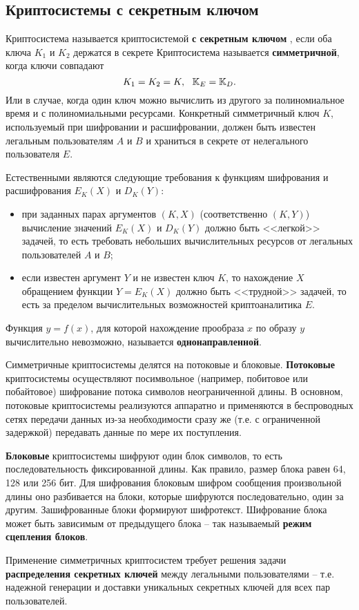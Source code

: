 ﻿\subsection{Криптосистемы с секретным ключом}

Криптосистема  называется криптосистемой \textbf{с секретным ключом} , если оба ключа $K_1$ и $K_2$ держатся в секрете
Криптосистема называется \textbf{симметричной}, когда ключи совпадают
    \[ K_1 = K_2 = K, ~~ \mathbb{K}_E = \mathbb{K}_D. \]
    Или в случае, когда один ключ можно вычислить из другого за полиномиальное время и с полиномиальными ресурсами.
Конкретный симметричный ключ $K$, используемый при шифровании и расшифровании, должен быть известен легальным пользователям $A$ и $B$ и храниться в секрете от нелегального пользователя $E$.

Естественными являются следующие требования к функциям шифрования и расшифрования  $E_K(X)$ и $D_K(Y)$:
\begin{itemize}
  \item при заданных парах аргументов $(K,X)$ (соответственно $(K,Y)$) вычисление значений $E_K(X)$ и $D_K(Y)$ должно быть <<легкой>> задачей, то есть требовать небольших вычислительных ресурсов от легальных пользователей $A$ и $B$;
  \item если известен аргумент $Y$ и не известен ключ $K$, то нахождение $X$ обращением  функции $Y = E_K(X)$
      должно быть <<трудной>> задачей, то есть за пределом вычислительных возможностей криптоаналитика $E$.
\end{itemize}

Функция $y = f(x)$, для которой нахождение прообраза $x$ по образу $y$ вычислительно невозможно, называется \textbf{однонаправленной}.

Симметричные криптосистемы делятся на потоковые и блоковые. \textbf{Потоковые} криптосистемы осуществляют посимвольное (например, побитовое или побайтовое) шифрование потока символов неограниченной длины. В основном, потоковые криптосистемы реализуются аппаратно и применяются в беспроводных сетях передачи данных из-за необходимости сразу же (т.е. с ограниченной задержкой) передавать данные по мере их поступления.

\textbf{Блоковые} криптосистемы шифруют один блок символов, то есть последовательность фиксированной длины. Как правило, размер блока равен 64, 128 или 256 бит. Для шифрования блоковым шифром  сообщения произвольной длины оно разбивается на блоки, которые шифруются последовательно, один за другим. Зашифрованные блоки формируют шифротекст. Шифрование блока может быть зависимым от предыдущего блока -- так называемый \textbf{режим сцепления блоков}.

Применение симметричных криптосистем требует решения  задачи \textbf{распределения секретных ключей} между легальными пользователями -- т.е. надежной генерации и доставки уникальных секретных ключей для всех пар пользователей.
